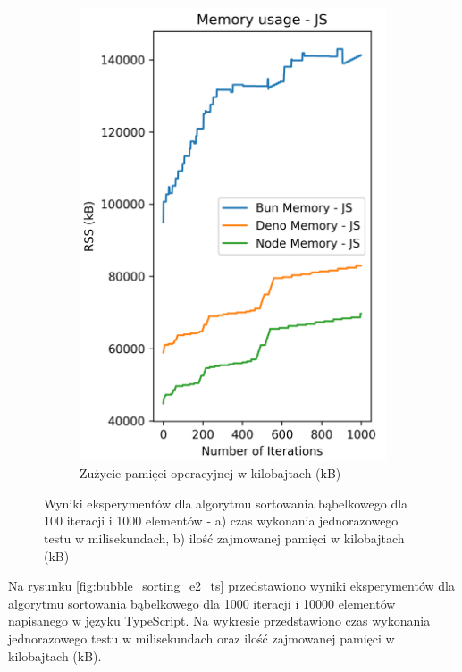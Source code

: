 \begin{figure}[H]
\begin{subfigure}[b]{0.4\textwidth}
    \includegraphics[width=\textwidth]{Figures/sorting/sorting_bubble_1000_1000_js_memory.png}
    \caption{Zużycie pamięci operacyjnej w kilobajtach (kB)}
    \label{fig:bubble_sorting_e2_memory}
  \end{subfigure}
  \caption{Wyniki eksperymentów dla algorytmu sortowania bąbelkowego dla 100 iteracji i 1000 elementów - a) czas wykonania jednorazowego testu w milisekundach, b) ilość zajmowanej pamięci w kilobajtach (kB)}
  \label{fig:bubble_sorting_e2}
\end{figure}

Na rysunku \ref{fig:bubble_sorting_e2_ts} przedstawiono wyniki eksperymentów dla algorytmu sortowania bąbelkowego dla 1000 iteracji i 10000 elementów napisanego w języku TypeScript. Na wykresie przedstawiono czas wykonania jednorazowego testu w milisekundach oraz ilość zajmowanej pamięci w kilobajtach (kB).


